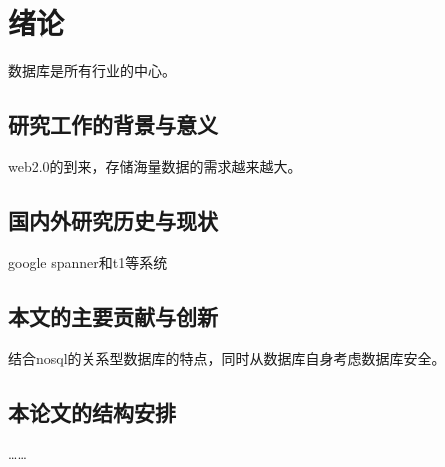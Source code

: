 
\chapter{绪论}
数据库是所有行业的中心。
\section{研究工作的背景与意义}
web2.0的到来，存储海量数据的需求越来越大。
\section{国内外研究历史与现状}
google spanner和t1等系统
\section{本文的主要贡献与创新}

结合nosql的关系型数据库的特点，同时从数据库自身考虑数据库安全。
\section{本论文的结构安排}


……
